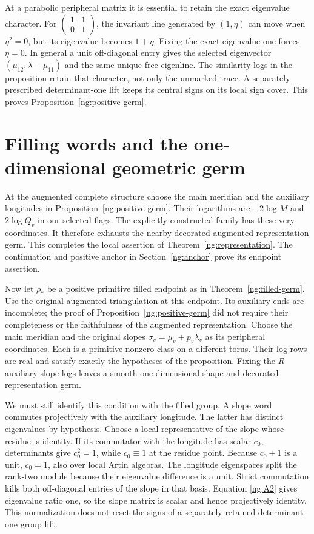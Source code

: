 At a parabolic peripheral matrix it is essential to retain the
exact eigenvalue character. For
$\left(\begin{smallmatrix}1&1\\0&1\end{smallmatrix}\right)$,
the invariant line generated by $(1,\eta)$ can move when
$\eta^2=0$, but its eigenvalue becomes $1+\eta$.
Fixing the exact eigenvalue one forces $\eta=0$.
In general a unit off-diagonal entry gives the selected eigenvector
$(\mu_{12},\lambda-\mu_{11})$ and the same unique free eigenline.
The similarity logs in the proposition retain that character,
not only the unmarked trace. A separately prescribed determinant-one
lift keeps its central signs on its local sign cover.
This proves Proposition~\ref{ng:positive-germ}.

\section{Filling words and the one-dimensional geometric germ}
\label{ng:filling-germ-proof}

At the augmented complete structure choose the main meridian and
the auxiliary longitudes in Proposition~\ref{ng:positive-germ}.
Their logarithms are $-2\log M$ and $2\log Q_v$ in our selected
flags. The explicitly constructed family has these very
coordinates. It therefore exhausts the nearby decorated
augmented representation germ. This completes the local assertion
of Theorem~\ref{ng:representation}. The continuation and positive
anchor in Section~\ref{ng:anchor} prove its endpoint assertion.

Now let $\rho_*$ be a positive primitive filled endpoint as in
Theorem~\ref{ng:filled-germ}. Use the original augmented
triangulation at this endpoint. Its auxiliary ends are incomplete;
the proof of Proposition~\ref{ng:positive-germ} did not require
their completeness or the faithfulness of the augmented representation.
Choose the main meridian and the original slopes
$\sigma_v=\mu_v+p_v\lambda_v$ as its peripheral coordinates.
Each is a primitive nonzero class on a different torus.
Their log rows are real and satisfy exactly the hypotheses of
the proposition. Fixing the $R$ auxiliary slope logs leaves a
smooth one-dimensional shape and decorated representation germ.

We must still identify this condition with the filled group.
A slope word commutes projectively with the auxiliary longitude.
The latter has distinct eigenvalues by hypothesis. Choose a local
representative of the slope whose residue is identity. If its
commutator with the longitude has scalar $c_0$, determinants give
$c_0^2=1$, while $c_0\equiv1$ at the residue point.
Because $c_0+1$ is a unit, $c_0=1$, also over local Artin algebras.
The longitude eigenspaces split the rank-two module because their
eigenvalue difference is a unit. Strict commutation kills both
off-diagonal entries of the slope in that basis.
Equation \eqref{ng:A2} gives eigenvalue ratio one, so the slope
matrix is scalar and hence projectively identity.
This normalization does not reset the signs of a separately
retained determinant-one group lift.

